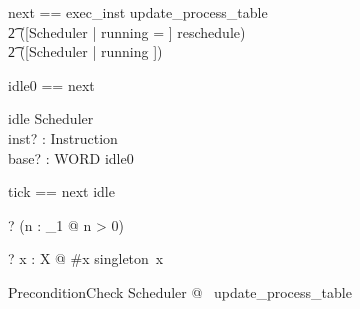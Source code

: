 \documentclass{article}
\begin{document}
\begin{zed}
  next == exec\_inst \pipe update\_process\_table \semi{} \\
    \t2 ([\Delta Scheduler | running = \emptyset] \land reschedule) \lor\\
    \t2 ([\Xi Scheduler | running \neq \emptyset])
\end{zed}

\begin{zed}
  idle0 == \lnot \pre next
\end{zed}

\begin{schema}{idle}
  \Xi Scheduler\\
  inst? : Instruction\\
  base? : WORD
\where
  idle0
\end{schema}

\begin{zed}
  tick == next \lor idle
\end{zed}

\begin{zed}
  \vdash? (\forall n : \nat_1 @ n > 0)
\end{zed}
\begin{zed}
  [X] \vdash? \forall x : \power X @ \#x  \iff singleton~x
\end{zed}

\begin{theorem}{PreconditionCheck}
   \forall Scheduler @ \pre~update\_process\_table
\end{theorem}
\end{document}
